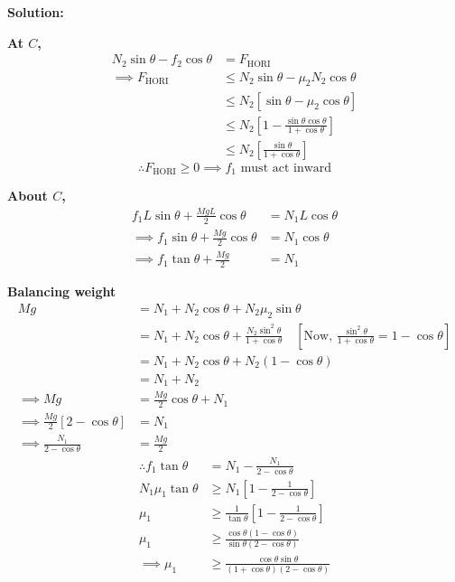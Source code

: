 \documentclass{article}
\theoremstyle{definition}
\newenvironment{solution}
  {\par\vspace{0.5em}\noindent\textbf{Solution:}\par\nopagebreak\vspace{0.3em}}
  {\par\vspace{1em}}
\begin{document}
\begin{solution}
\begin{minipage}[t]{0.59\textwidth}
    \vspace{0.5em}
    \textbf{At $C$,}
    \begin{align*}
    N_2 \sin\theta - f_2 \cos\theta &= F_{\text{HORI}} \\
    \implies F_{\text{HORI}} &\le N_2 \sin\theta - \mu_2 N_2 \cos\theta \\
    &\le N_2 \left[ \sin\theta - \mu_2 \cos\theta \right] \\
    &\le N_2 \left[ 1 - \frac{\sin\theta \cos\theta}{1 + \cos\theta} \right] \\
    &\le N_2 \left[ \frac{\sin\theta}{1 + \cos\theta} \right]
    \end{align*}
    \[
    \therefore F_{\text{HORI}} \ge 0 \implies f_1 \text{ must act inward}
    \]
    \end{minipage}
    
    \vspace{1.5em}
    \noindent
    \textbf{About $C$,}
    \begin{align*}
    f_1 L \sin\theta + \frac{Mg L}{2} \cos\theta &= N_1 L \cos\theta \\
    \implies f_1 \sin\theta + \frac{Mg}{2} \cos\theta &= N_1 \cos\theta \\
    \implies f_1 \tan\theta + \frac{Mg}{2} &= N_1
    \end{align*}
    
    \vspace{1em}
    \noindent
    \textbf{Balancing weight}
    \begin{align*}
    Mg &= N_1 + N_2 \cos\theta + N_2 \mu_2 \sin\theta \\
    &= N_1 + N_2 \cos\theta + \frac{N_2 \sin^2\theta}{1 + \cos\theta} \quad \left[ \text{Now, } \frac{\sin^2\theta}{1 + \cos\theta} = 1 - \cos\theta \right] \\
    &= N_1 + N_2 \cos\theta + N_2 (1 - \cos\theta) \\
    &= N_1 + N_2 \\[6pt]
    \implies Mg &= \frac{Mg}{2} \cos\theta + N_1 \\
    \implies \frac{Mg}{2} \left[ 2 - \cos\theta \right] &= N_1 \\
    \implies \frac{N_1}{2 - \cos\theta} &= \frac{Mg}{2}
    \end{align*}
    \begin{align*}
    \therefore f_1 \tan\theta &= N_1 - \frac{N_1}{2 - \cos\theta} \\[8pt]
    N_1 \mu_1 \tan\theta &\ge N_1 \left[ 1 - \frac{1}{2 - \cos\theta} \right] \\[8pt]
    \mu_1 &\ge \frac{1}{\tan\theta} \left[ 1 - \frac{1}{2 - \cos\theta} \right] \\[8pt]
    \mu_1 &\ge \frac{\cos\theta (1 - \cos\theta)}{\sin\theta (2 - \cos\theta)} \\[8pt]
    \implies \mu_1 &\ge \frac{\cos\theta \sin\theta}{(1 + \cos\theta)(2 - \cos\theta)}
    \end{align*}
\end{solution}
\end{document}
